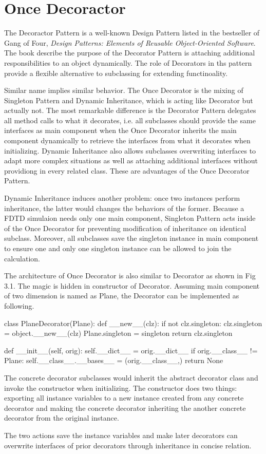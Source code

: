\section{Once Decoractor}
The Decoractor Pattern is a well-known Design Pattern listed in the bestseller of Gang of Four, \textit{Design Patterns:
  Elements of Reusable Object-Oriented Software}. The book describe the purpose of the Decorator Pattern is attaching
additional responsibilities to an object dynamically. The role of Decorators in ths pattern provide a flexible
alternative to subclassing for extending functinoality.

Similar name implies similar behavior. The Once Decorator is the mixing of Singleton Pattern and Dynamic Inheritance,
which is acting like Decorator but actually not. The most remarkable difference is the Decorator Pattern delegates all
method calls to what it decorates, i.e. all subclasses should provide the same interfaces as main component when the
Once Decorator inherits the main component dynamically to retrieve the interfaces from what it decorates when
initializing. Dynamic Inheritance also allows subclasses overwriting interfaces to adapt more complex situations as well
as attaching additional interfaces without providiong in every related class. These are advantages of the Once Decorator
Pattern.

Dynamic Inheritance induces another problem: once two instances perform inheritance, the latter would changes the
behaviors of the former. Because a FDTD simulaion needs only one main component, Singleton Pattern acts inside of the
Once Decorator for preventing modification of inheritance on identical subclass. Moreover, all subclasses save the
singleton instance in main component to ensure one and only one singleton instance can be allowed to join the
calculation.

The architecture of Once Decorator is also similar to Decorator as shown in Fig 3.1. The magic is hidden in constructor
of Decorator. Assuming main component of two dimension is named as Plane, the Decorator can be implemented as following.
\begin{code}
  class PlaneDecorator(Plane):
    def __new__(clz):
        if not clz.singleton:
            clz.singleton = object.__new__(clz)
            Plane.singleton = singleton
        return clz.singleton

    def __init__(self, orig):
        self.__dict__ = orig.__dict__
        if orig.__class__ != Plane:
            self.__class__.__bases__ = (orig.__class__,)
        return None
\end{code}
The concrete decorator subclasses would inherit the abstract decorator class and invoke the constructor when
initializing. The constructor does two things: exporting all instance variables to a new instance created from any
concrete decorator and making the concrete decorator inheriting the another concrete decorator from the original
instance.

The two actions save the instance variables and make later decorators can overwrite interfaces of prior decorators
through inheritance in concise relation.
